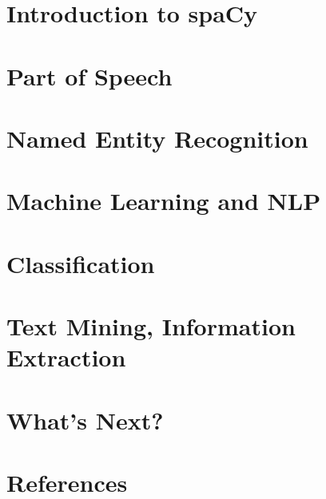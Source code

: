 % 

\section[spaCy]{Introduction to spaCy}



\section[POS]{Part of Speech}
% 



\section[NER]{Named Entity Recognition}
% 


\section[MLNLP]{Machine Learning and NLP}
 


\section[Class]{Classification}



\section[IR]{Text Mining, Information Extraction}
%  


\section[Next]{What's Next?}



\section[Refs]{References}


